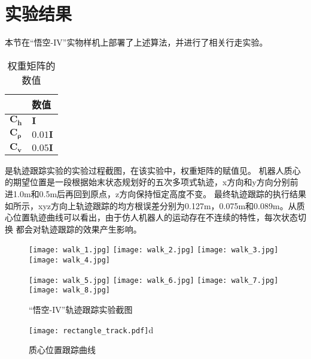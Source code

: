 \section{实验结果}
\label{sec:controller_exp}
本节在“悟空-IV”实物样机上部署了上述算法，并进行了相关行走实验。
\begin{table}[htbp]
	\centering
	\caption{权重矩阵的数值}
	\label{tab:qp_weight}
	\begin{tabular}{m{2cm}<{\centering}m{2cm}<{\centering}}
		\toprule  %
		\fangsong{参数名称}   &数值  \\
		\midrule  %
		${{\boldsymbol{C}}_{{\dot{\boldsymbol{h}}}}}$    & $\mathbf{I}$\\
		${\boldsymbol{{C}}_{\boldsymbol{\rho} }}$ &  $0.01 \mathbf{I}$ \\
		${\boldsymbol{C}_{{\dot{\boldsymbol{v}}}}}$ & $0.05 \mathbf{I}$ \\
		\bottomrule %
	\end{tabular}
\end{table}
是轨迹跟踪实验的实验过程截图，在该实验中，权重矩阵的赋值见。
机器人质心的期望位置是一段根据始末状态规划好的五次多项式轨迹，x方向和y方向分别前进1.0m和0.5m后再回到原点，z方向保持恒定高度不变。
最终轨迹跟踪的执行结果如所示，xyz方向上轨迹跟踪的均方根误差分别为0.127m，0.075m和0.089m。从质心位置轨迹曲线可以看出，由于仿人机器人的运动存在不连续的特性，每次状态切换
都会对轨迹跟踪的效果产生影响。
\begin{figure}[htbp]
    \centering
    \texttt{[image: walk\_1.jpg]}
    \texttt{[image: walk\_2.jpg]}
    \texttt{[image: walk\_3.jpg]}
    \texttt{[image: walk\_4.jpg]}

    \texttt{[image: walk\_5.jpg]}
    \texttt{[image: walk\_6.jpg]}
    \texttt{[image: walk\_7.jpg]}
    \texttt{[image: walk\_8.jpg]}   
    \caption{\label{fig:track_exp}“悟空-IV”轨迹跟踪实验截图}
\end{figure}
\begin{figure}[htbp]
    \centering
    \texttt{[image: rectangle\_track.pdf]}d
    \caption{\label{fig:com_pos_track}质心位置跟踪曲线}
\end{figure}
